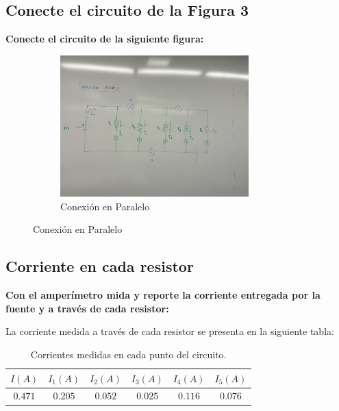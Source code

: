 \subsection{Conecte el circuito de la Figura 3}
\textbf{Conecte el circuito de la siguiente figura:}
\begin{figure}[H]
    \centering
    \begin{subfigure}[b]{\textwidth}
        \centering
        \includegraphics[width=0.8\textwidth]{Figures/1. Content/ConexionParalelo.jpg}
        \caption{Conexión en Paralelo}
        \label{fig: Conexion Paralelo}
    \end{subfigure}
    \hfill
\end{figure}

\subsection{Corriente en cada resistor}
\textbf{Con el amperímetro mida y reporte la corriente entregada por la fuente y a través de cada resistor:}

La corriente medida a través de cada resistor se presenta en la siguiente tabla:

\begin{table}[h]
\centering
\begin{tabular}{|c|c|c|c|c|c|}
\hline
\(I (A)\) & \(I_1 (A)\) & \(I_2 (A)\) & \(I_3 (A)\) & \(I_4 (A)\) & \(I_5 (A)\) \\ \hline
$0.471$     & $0.205$       & $0.052$       & $0.025$       & $0.116$       & $0.076$       \\ \hline
\end{tabular}
\caption{Corrientes medidas en cada punto del circuito.}
\label{tab:current_measurements}
\end{table}

